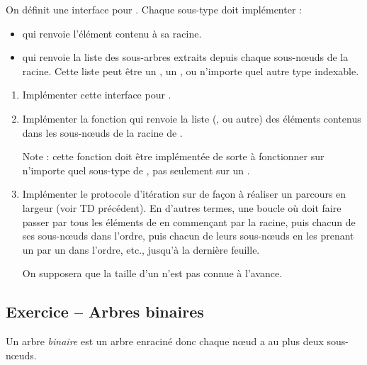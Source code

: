 \documentclass{article}
\newcounter{loop}
\newcounter{numEx}
\newcommand{\exo}[1]{
	\stepcounter{numEx}
	\setcounter{loop}{0}
	\subsection*{Exercice \arabic{numEx} -- #1}
}
\begin{document}
\noindent On définit une interface pour . Chaque sous-type doit implémenter :
\begin{itemize}
	\item {} qui renvoie l'élément contenu à sa racine.
	\item {} qui renvoie la liste des sous-arbres extraits depuis chaque sous-nœuds de la racine. Cette liste peut être un , un , ou n'importe quel autre type indexable.
\end{itemize}

\begin{enumerate}[resume]
	\item Implémenter cette interface pour .
	
	\item Implémenter la fonction  qui renvoie la liste (,  ou autre) des éléments contenus dans les sous-nœuds de la racine de .
	
	Note : cette fonction doit être implémentée de sorte à fonctionner sur n'importe quel sous-type de , pas seulement sur un .
	
	\item Implémenter le protocole d'itération sur  de façon à réaliser un parcours en largeur (voir TD précédent). En d'autres termes, une boucle  où  doit faire passer  par tous les éléments de  en commençant par la racine, puis chacun de ses sous-nœuds dans l'ordre, puis chacun de leurs sous-nœuds en les prenant un par un dans l'ordre, etc., jusqu'à la dernière feuille.
	
	On supposera que la taille d'un  n'est pas connue à l'avance.
\end{enumerate}

\exo{Arbres binaires}

Un arbre \emph{binaire} est un arbre enraciné donc chaque nœud a au plus deux sous-nœuds.
\end{document}
